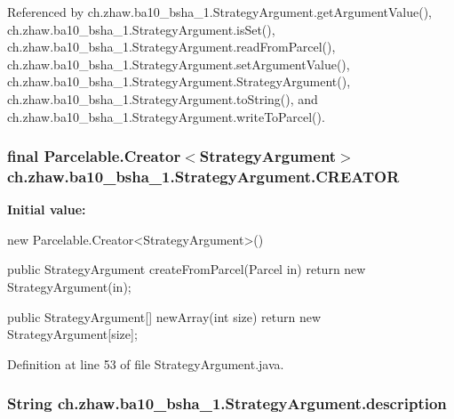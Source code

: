 Referenced by ch.zhaw.ba10\_\-bsha\_\-1.StrategyArgument.getArgumentValue(), ch.zhaw.ba10\_\-bsha\_\-1.StrategyArgument.isSet(), ch.zhaw.ba10\_\-bsha\_\-1.StrategyArgument.readFromParcel(), ch.zhaw.ba10\_\-bsha\_\-1.StrategyArgument.setArgumentValue(), ch.zhaw.ba10\_\-bsha\_\-1.StrategyArgument.StrategyArgument(), ch.zhaw.ba10\_\-bsha\_\-1.StrategyArgument.toString(), and ch.zhaw.ba10\_\-bsha\_\-1.StrategyArgument.writeToParcel().\hypertarget{classch_1_1zhaw_1_1ba10__bsha__1_1_1StrategyArgument_a6f093e36dac1d9e9a4f9f7e238438566}{
\subsubsection[{CREATOR}]{\setlength{\rightskip}{0pt plus 5cm}final Parcelable.Creator$<${\bf StrategyArgument}$>$ {\bf ch.zhaw.ba10\_\-bsha\_\-1.StrategyArgument.CREATOR}}}
\label{classch_1_1zhaw_1_1ba10__bsha__1_1_1StrategyArgument_a6f093e36dac1d9e9a4f9f7e238438566}
{\bfseries Initial value:}
\begin{DoxyCode}
 new Parcelable.Creator<StrategyArgument>() {
                public StrategyArgument createFromParcel(Parcel in) {
                        return new StrategyArgument(in);
                }

                public StrategyArgument[] newArray(int size) {
                        return new StrategyArgument[size];
                }
        }
\end{DoxyCode}


Definition at line 53 of file StrategyArgument.java.\hypertarget{classch_1_1zhaw_1_1ba10__bsha__1_1_1StrategyArgument_ac73a5de1e59e47ee8dde08e59b5dfa66}{
\subsubsection[{description}]{\setlength{\rightskip}{0pt plus 5cm}String {\bf ch.zhaw.ba10\_\-bsha\_\-1.StrategyArgument.description}}}
\label{classch_1_1zhaw_1_1ba10__bsha__1_1_1StrategyArgument_ac73a5de1e59e47ee8dde08e59b5dfa66}


